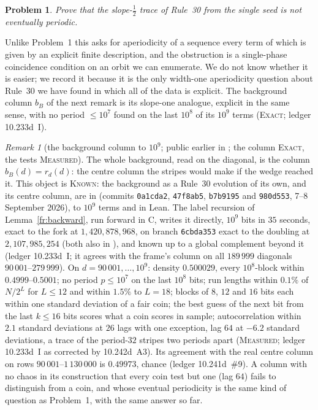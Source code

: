 \documentclass[11pt]{article}
\newtheorem{problem}[theorem]{Problem}
\theoremstyle{definition}
\theoremstyle{remark}
\newtheorem{remark}[theorem]{Remark}
\newcommand{\EXACT}{\textsc{Exact}}
\newcommand{\MEASURED}{\textsc{Measured}}
\newcommand{\KNOWN}{\textsc{Known}}
\begin{document}
\begin{problem}\label{fr:wallproblem}
Prove that the slope-$\tfrac12$ trace of Rule~30 from the single seed is not eventually periodic.
\end{problem}

Unlike Problem~1 this asks for aperiodicity of a sequence every term of which is given by an explicit
finite description, and the obstruction is a single-phase coincidence condition on an orbit we can
enumerate. We do not know whether it is easier; we record it because it is the only width-one
aperiodicity question about Rule~30 we have found in which all of the data is explicit. The background column $b_B$ of the next remark is its slope-one analogue, explicit in the same sense, with no period $\le10^{7}$ found on the last $10^{8}$ of its $10^{9}$ terms (\EXACT; ledger 10.233d~I).

\begin{remark}[the background column to $10^{9}$; public earlier in \cite{Dib}; the column \EXACT, the tests \MEASURED]\label{fr:frozencolumn}
The whole background, read on the diagonal, is the column $b_B(d)=r_d(d)$: the centre column the stripes would make if the wedge reached it. This object is \KNOWN: the background as a Rule~30 evolution of its own, and its centre column, are in \cite{Dib} (commits \texttt{0a1cda2}, \texttt{47f8ab5}, \texttt{b7b9195} and \texttt{980d553}, 7--8 September 2026), to $10^{9}$ terms and in Lean. The label recursion of Lemma~\ref{fr:backward}, run forward in C, writes it directly, $10^{9}$ bits in $35$ seconds, exact to the fork at $1{,}420{,}878{,}968$, on branch \texttt{6cbda353} exact to the doubling at $2{,}107{,}985{,}254$ (both also in \cite{Dib,Pat}), and known up to a global complement beyond it (ledger 10.233d~I; it agrees with the frame's column on all $189\,999$ diagonals $90\,001$--$279\,999$). On $d=90\,001,\dots,10^{9}$: density $0.500029$, every $10^{8}$-block within $0.4999$--$0.5001$; no period $p\le10^{7}$ on the last $10^{8}$ bits; run lengths within $0.1\%$ of $N/2^{L}$ for $L\le12$ and within $1.5\%$ to $L=18$; blocks of $8$, $12$ and $16$ bits each within one standard deviation of a fair coin; the best guess of the next bit from the last $k\le16$ bits scores what a coin scores in sample; autocorrelation within $2.1$ standard deviations at $26$ lags with one exception, lag $64$ at $-6.2$ standard deviations, a trace of the period-$32$ stripes two periods apart (\MEASURED; ledger 10.233d~I as corrected by 10.242d~A3). Its agreement with the real centre column on rows $90\,001$--$1\,130\,000$ is $0.49973$, chance (ledger 10.241d~\#9). A column with no chaos in its construction that every coin test but one (lag $64$) fails to distinguish from a coin, and whose eventual periodicity is the same kind of question as Problem~1, with the same answer so far.
\end{remark}
\end{document}

